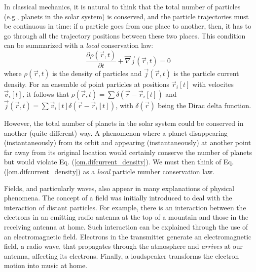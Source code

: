 \documentclass[onecolumn,nofootinbib, secnumarabic, amsmath, nobibnotes,12pt,aps,pra]{revtex4-1}
\newcommand{\eref}[1]{Eq. (\ref{#1})}
\begin{document}
In classical mechanics, it is natural to think that the total number
of particles (e.g., planets in the solar system) is conserved, and
the particle trajectories must be continuous in time: if a particle
goes from one place to another, then, it  has to go through all the trajectory
positions between these two places. This condition can be summarized
with a \textit{local} conservation law:
\begin{equation}
\label{om.difcurrent_density}
\frac{\partial\rho(\vec{r},t)}{\partial t} + \vec{\nabla} \vec{j}(\vec{r},t) = 0
\end{equation}
where $\rho(\vec{r},t)$ is the density of particles and
$\vec{j}(\vec{r},t)$ is the particle current density. For an
ensemble of point particles at positions $\vec{r}_i[t]$ with
velocites $\vec{v}_i[t]$, it follows that $\rho(\vec{r},t) =
\sum\delta(\vec{r}-\vec{r}_{i}[t])$ and $\vec{j}(\vec{r},t) =
\sum\vec{v}_{i}[t] \delta(\vec{r}-\vec{r}_{i}[t])$, with
$\delta(\vec{r})$ being the Dirac delta function.

However, the total number of planets in the solar system could be conserved in another (quite different) way.
A phenomenon where a planet disappearing (instantaneously) from its orbit and appearing (instantaneously) at another point far away from its original location would certainly conserve the number of planets but would violate \eref{om.difcurrent_density}. We must then think of \eref{om.difcurrent_density} as a \textit{local} particle number conservation law.

Fields, and particularly waves, also appear in many explanations of
physical phenomena. The concept of a field was initially introduced
to deal with the interaction of distant particles.  For example,
there is an interaction between the electrons in an emitting radio
antenna at the top of a mountain and those in the receiving antenna
at home. Such interaction can be explained through the use of an
electromagnetic field. Electrons in the transmitter generate an
electromagnetic field, a radio wave, that propagates through the
atmosphere and \textit{arrives} at our antenna, affecting its
electrons. Finally, a loudspeaker transforms the electron motion
into music at home.
\end{document}
